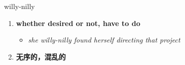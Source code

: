 
\begin{frame}
{\huge willy-nilly}
\begin{center}
\begin{enumerate}\Large
  \item \textbf{whether desired or not, have to do}
  \begin{itemize}
    \item \em{\Large{she willy-nilly found herself directing that project}}
  \end{itemize}
  \item \textbf{无序的，混乱的}
\end{enumerate}
\end{center}
\end{frame}
